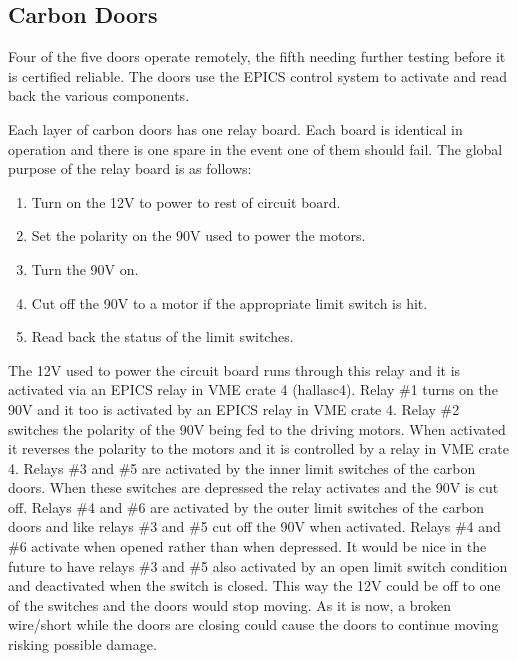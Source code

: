 \subsection{Carbon Doors}


Four of the five doors operate remotely, the fifth needing further
testing before it is certified reliable. The
doors use the EPICS control system to activate and read back the
various components. 

Each layer of carbon doors has one relay board. 
Each board is identical in operation and
there is one spare in the event one of them should fail. The global
purpose of the relay board is as follows:

\begin{enumerate}
\item Turn on the 12V to power to rest of circuit board.

\item Set the polarity on the 90V used to power the motors.

\item Turn the 90V on.

\item Cut off the 90V to a motor if the appropriate limit switch is
hit.

\item Read back the status of the limit switches.
\end{enumerate}

The 12V used to power the circuit board runs through this relay and it is
activated via an EPICS relay in VME crate 4 (hallasc4). Relay \#1 turns
on the 90V and it too is activated by an EPICS  relay in VME crate 4.
Relay \#2 switches the polarity of the 90V being fed to the driving
motors. When activated it reverses the polarity to the motors and it is
controlled by a relay in VME crate 4. Relays \#3 and \#5 are activated by
the inner limit switches of the carbon doors. When these switches are
depressed the relay activates and the 90V is cut off. Relays \#4 and \#6
are activated by the outer limit switches of the carbon doors and like
relays \#3 and \#5 cut off the 90V when activated. Relays \#4 and
\#6 activate when opened rather than when depressed.
It would be nice in the
future to have relays \#3 and \#5 also activated by an open limit
switch condition and deactivated when the switch is closed. This way
the 12V could be off to one of the switches and the doors would stop
moving. As it is now, a broken wire/short while the doors are
closing could cause the doors to continue moving risking possible damage.



